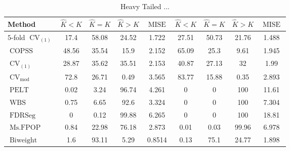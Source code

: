 \begin{table}[ht]
\centering
\begin{tabular}{|l|cccc|cccc|}
  \hline
Method & $\hat{K} < K$ & $\hat{K} = K$ & $\hat{K} > K$ & $\operatorname{MISE}$ & $\hat{K} < K$ & $\hat{K} = K$ & $\hat{K} > K$ & $\operatorname{MISE}$ \\ 
  \hline
$5$-fold $\operatorname{CV}_{(1)}$ &  17.4 & 58.08 & 24.52 & 1.722 & 27.51 & 50.73 & 21.76 & 1.488 \\ 
  $\operatorname{COPSS}$ & 48.56 & 35.54 &  15.9 & 2.152 & 65.09 &  25.3 &  9.61 & 1.945 \\ 
  $\operatorname{CV}_{(1)}$ & 28.87 & 35.62 & 35.51 & 2.153 & 40.87 & 27.13 &    32 &  1.99 \\ 
  $\operatorname{CV}_{\operatorname{mod}}$ &  72.8 & 26.71 &  0.49 & 3.565 & 83.77 & 15.88 &  0.35 & 2.893 \\ 
  $\operatorname{PELT}$ &  0.02 &  3.24 & 96.74 & 4.261 &     0 &     0 &   100 & 11.61 \\ 
  $\operatorname{WBS}$ &  0.75 &  6.65 &  92.6 & 3.324 &     0 &     0 &   100 & 7.304 \\ 
  $\operatorname{FDRSeg}$ &     0 &  0.12 & 99.88 & 6.265 &     0 &     0 &   100 & 18.81 \\ 
  $\operatorname{Ms.FPOP}$ &  0.84 & 22.98 & 76.18 & 2.873 &  0.01 &  0.03 & 99.96 & 6.978 \\ 
  $\operatorname{Biweight}$ &   1.6 & 93.11 &  5.29 & 0.8514 &  0.13 &  75.1 & 24.77 & 1.898 \\ 
   \hline
\end{tabular}
\caption{Heavy Tailed ...} 
\end{table}
